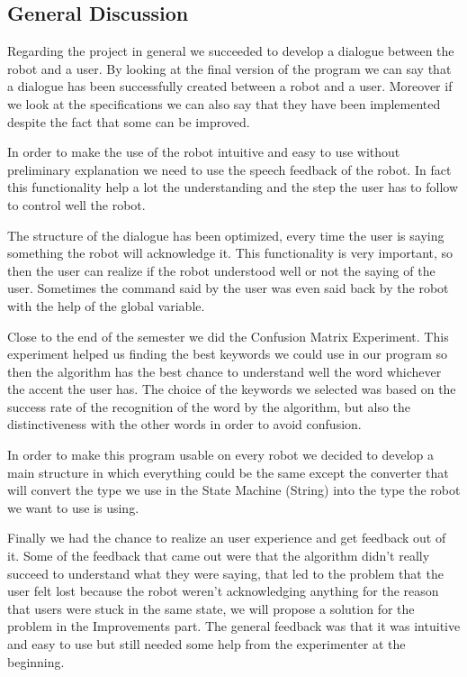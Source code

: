 \subsection{General Discussion}
Regarding the project in general we succeeded to develop a dialogue between the robot and a user. 
By looking at the final version of the program we can say that a dialogue has been successfully created between a robot and a user. Moreover if we look at the specifications we can also say that they have been implemented despite the fact that some can be improved.

In order to make the use of the robot intuitive and easy to use without preliminary explanation we need to use the speech feedback of the robot. In fact this functionality help a lot the understanding and the step the user has to follow to control well the robot.

The structure of the dialogue has been optimized, every time the user is saying something the robot will acknowledge it. This functionality is very important, so then the user can realize if the robot understood well or not the saying of the user. Sometimes the command said by the user was even said back by the robot with the help of the global variable.

Close to the end of the semester we did the Confusion Matrix Experiment. This experiment helped us finding the best keywords we could use in our program so then the algorithm has the best chance to understand well the word whichever the accent the user has. The choice of the keywords we selected was based on the success rate of the recognition of the word by the algorithm, but also the distinctiveness with the other words in order to avoid confusion. 

In order to make this program usable on every robot we decided to develop a main structure in which everything could be the same except the converter that will convert the type we use in the State Machine (String) into the type the robot we want to use is using. 

Finally we had the chance to realize an user experience and get feedback out of it. Some of the feedback that came out were that the algorithm didn't really succeed to understand what they were saying, that led to the problem that the user felt lost because the robot weren't acknowledging anything for the reason that users were stuck in the same state, we will propose a solution for the problem in the Improvements part. The general feedback was that it was intuitive and easy to use but still needed some help from the experimenter at the beginning. \\

